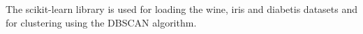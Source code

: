 The scikit-learn library \cite{scikit-learn} is used for loading the wine, iris and diabetis datasets and for clustering using the DBSCAN algorithm.